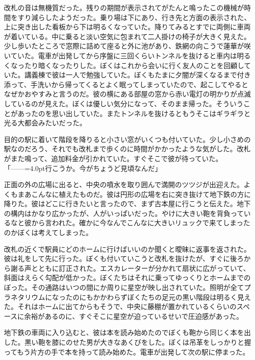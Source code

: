 \documentclass[b5j,twoside,twocolumn]{utarticle}
\begin{document}
改札の音は無機質だった。残りの期間が表示されてがたんと鳴ったこの機械が時間をすり減らしたようだった。乗り場は下にあり、行き先と方面の表示された、上に突き出した看板から下は明るくなっていた。降りてみるとすでに両側に車両が着いている。中に乗ると淡い空気に包まれて二人掛けの椅子が大きく見えた。少し歩いたところで窓際に詰めて座ると外に池があり、鉄網の向こうで蓮華が咲いていた。電車が出発してから序盤に三回くらいトンネルを抜けると車内は明るくなったり暗くなったりした。ぼくはこれから会いに行く友人のことを回顧していた。講義棟で彼は一人で勉強していた。ぼくもたまに夕闇が深くなるまで付き添って、手洗いから帰ってくるとよく眠ってしまっていたので、起こしてやるとなぜかおやすみと言うのだ。彼の横にある部屋の窓から赤い電灯の明かりが点滅しているのが見えた。ぼくは優しい気分になって、そのまま帰った。そういうことがあったのを思い出していた。またトンネルを抜けるともうそこはギラギラと光る大都会みたいだった。


目的の駅に着いて階段を降りると小さい窓がいくつも付いていた。少し小さめの駅なのだろう、それでも改札まで歩くのに時間がかかったような気がした。改札がまた鳴って、追加料金が引かれていた。すぐそこで彼が待っていた。\\
「\tbaselineshift=2.5pt------\tbaselineshift=4.0pt行こうか。今がちょうど見頃なんだ」


正面の外の広場に出ると、中央の噴水を取り囲んで満開のツツジが出迎えた。よくもまあこんなに植えたものだ。彼は円形の広場を右に突き抜けて地下鉄の方に降りた。彼はどこに行きたいと言ったので、まず古本屋に行こうと伝えた。地下の構内はかなり広かったが、人がいっぱいだった。やけに大きい鞄を背負っているなと彼から言われた。確かに今なんでこんなに大きいリュックで来てしまったのかぼくは考えてしまった。


改札の近くで駅員にどのホームに行けばいいのか聞くと曖昧に返事を返された。彼は礼をして先に行った。ぼくも付いていこうと改札を抜けたが、すぐに後ろから謝る声とともに訂正された。エスカレーターが分かれて扇状に広がっていて、斜面はえらく勾配が低かった。ぼくたちはそれに乗ってゆっくりとホームまでのぼった。その通路はいつの間にか周りに星空が映し出されていた。照明が全てプラネタリウムになったのにもかかわらずぼくたちの足元の黒い階段は明るく見えた。それはホームに出てからもそうで、中央に藤棚が置かれているくらいのスペースに余裕があるのに、すぐそこに星空が迫っているせいで圧迫感があった。


地下鉄の車両に入り込むと、彼は本を読み始めたのでぼくも鞄から同じく本を出した。黒い鞄を膝にのせた男が大きなあくびをした。ぼくは吊革をしっかりと握ってもう片方の手で本を持って読み始めた。電車が出発して次の駅に停まった。
\end{document}
